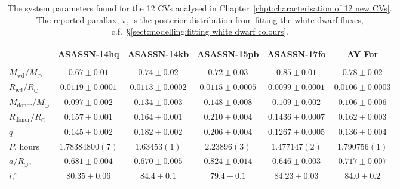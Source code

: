 \begin{landscape}

    \begin{table*}
        \centering
        \caption{The system parameters found for the 12 CVs analysed in Chapter~\ref{chpt:characterisation of 12 new CVs}. The reported parallax, $\pi$, is the posterior distribution from fitting the white dwarf fluxes, c.f.~\S\ref{sect:modelling:fitting white dwarf colours}.}
        \label{appendix:table:12 new cvs:system_parameters}
        \begin{tabular}{lccccc}
            \hline \\
            ~                          & \textbf{ASASSN-14hq}    & \textbf{ASASSN-14kb}     & \textbf{ASASSN-15pb}      & \textbf{ASASSN-17fo}      & \textbf{AY For}       \\
            \hline \hline \\
            $M_\mathrm{wd}/M_\odot$    & $0.67\pm0.01$           & $0.74\pm0.02$            & $0.72\pm0.03$             & $0.85\pm0.01$             & $0.78\pm0.02$         \\
            $R_\mathrm{wd}/R_\odot$    & $0.0119\pm0.0001$       & $0.0113\pm0.0002$        & $0.0115\pm0.0005$         & $0.0099\pm0.0001$         & $0.0106\pm0.0003$ \\
            $M_\mathrm{donor}/M_\odot$ & $0.097\pm0.002$         & $0.134\pm0.003$          & $0.148\pm0.008$           & $0.109\pm0.002$           & $0.106\pm0.006$ \\
            $R_\mathrm{donor}/R_\odot$ & $0.157\pm0.001$         & $0.164\pm0.001$          & $0.210\pm0.004$           & $0.1436\pm0.0007$         & $0.162\pm0.003$ \\
            $q$                        & $0.145\pm0.002$         & $0.182\pm0.002$          & $0.206\pm0.004$           & $0.1267\pm0.0005$         & $0.136\pm0.004$ \\
            \hline
            $P$, hours                 & $1.78384800(7)$         & $1.63453(1)$             & $2.23896(3)$              & $1.477147(2)$             & $1.790756(1)$ \\
            $a/R_\odot$,               & $0.681\pm0.004$         & $0.670\pm0.005$          & $0.824\pm0.014$           & $0.646\pm0.003$           & $0.717\pm0.007$ \\
            $i, ^\circ$                & $80.35\pm0.06$          & $84.4\pm0.1$             & $79.4\pm0.1$              & $84.23\pm0.03$            & $84.0\pm0.2$ \\

\end{tabular}
\end{table*}
\end{landscape}
